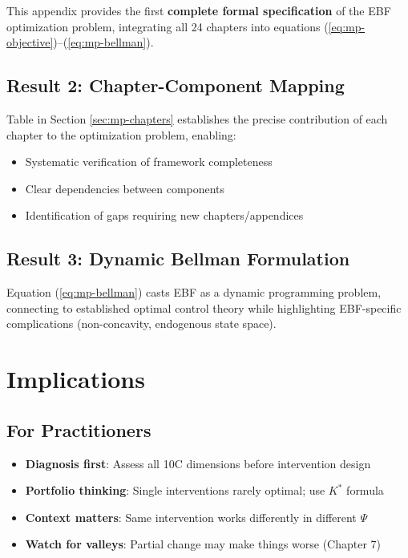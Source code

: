 This appendix provides the first \textbf{complete formal specification} of the
EBF optimization problem, integrating all 24 chapters into equations
(\ref{eq:mp-objective})--(\ref{eq:mp-bellman}).

\subsection{Result 2: Chapter-Component Mapping}

Table in Section \ref{sec:mp-chapters} establishes the precise contribution
of each chapter to the optimization problem, enabling:
\begin{itemize}
\item Systematic verification of framework completeness
\item Clear dependencies between components
\item Identification of gaps requiring new chapters/appendices
\end{itemize}

\subsection{Result 3: Dynamic Bellman Formulation}

Equation (\ref{eq:mp-bellman}) casts EBF as a dynamic programming problem,
connecting to established optimal control theory while highlighting
EBF-specific complications (non-concavity, endogenous state space).

\section{Implications}
\label{sec:mp-implications}

\subsection{For Practitioners}

\begin{itemize}
\item \textbf{Diagnosis first}: Assess all 10C dimensions before intervention design
\item \textbf{Portfolio thinking}: Single interventions rarely optimal; use $K^*$ formula
\item \textbf{Context matters}: Same intervention works differently in different $\Psi$
\item \textbf{Watch for valleys}: Partial change may make things worse (Chapter 7)
\end{itemize}

